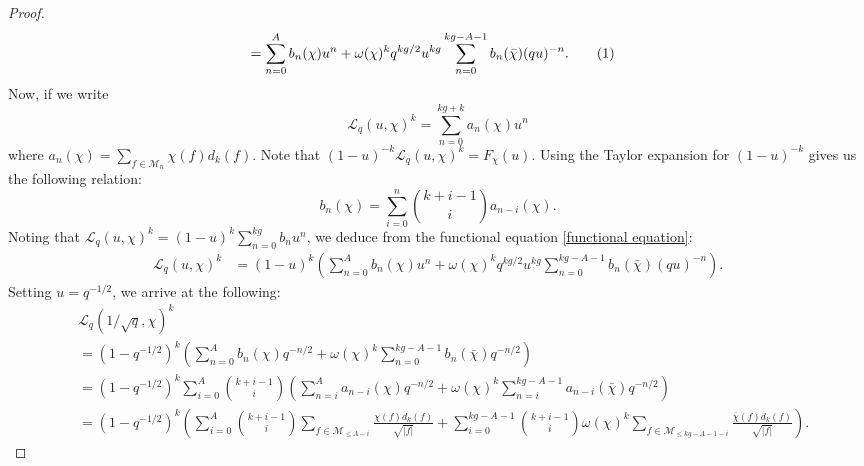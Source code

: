 \documentclass[10pt,a4paper]{amsart}
\newcommand\numberthis{\addtocounter{equation}{1}\tag{\theequation}}
\newcommand{\cM}{\mathcal{M}}
\begin{document}
\begin{proof}
\begin{align*}
    &=\sum_{n=0}^{A} b_n(\chi) u^{n}+\omega(\chi)^k q^{kg/2}u^{kg}\sum_{n=0}^{kg-A-1}b_n(\bar \chi)(qu)^{-n}.\numberthis\label{functional equation}
\end{align*}
Now, if we  write
$$
\mathcal{L}_q\left(u, \chi\right)^{k}=\sum_{n=0}^{k g+k} a_n(\chi) u^{n}
$$
where $a_n(\chi)=\sum_{f \in \mathcal{M}_{n}} \chi(f) d_{k}(f)$.  %
Note that $(1-u)^{-k}\mathcal{L}_q\left(u, \chi\right)^{k}=F_\chi(u)$. Using the Taylor expansion for $(1-u)^{-k}$ gives us the following relation: 
\begin{equation}\label{binomial inversion}
    b_n(\chi)=\sum_{i=0}^{n} \binom{k+i-1}{i} a_{n-i}(\chi).
\end{equation}
 Noting that $\mathcal{L}_q\left(u, \chi\right)^{k}=(1-u)^k\sum_{n=0}^{kg}b_n u^n$, we deduce from the functional equation \eqref{functional equation}:
\begin{align*}
    \mathcal{L}_q\left(u, \chi\right)^{k}&=(1-u)^k\left(\sum_{n=0}^{A} b_n(\chi) u^{n}+\omega(\chi)^k q^{kg/2}u^{kg}\sum_{n=0}^{kg-A-1}b_n(\bar \chi)(qu)^{-n}\right).
\end{align*}
Setting $u=q^{-1/2}$, we arrive at the following:
{\small\begin{align*}&\mathcal{L}_q\left(1/\sqrt{q}, \chi\right)^{k}\\
    & =(1-q^{-1/2})^k\left(\sum_{n=0}^{A} b_n(\chi) q^{-n/2}+\omega(\chi)^k \sum_{n=0}^{kg-A-1}b_n(\bar \chi)q^{-n/2}\right)\\&=(1-q^{-1/2})^k\sum_{i=0}^{A}\binom{k+i-1}{i}\left(\sum_{n=i}^{A} a_{n-i}(\chi) q^{-n/2}+\omega(\chi)^k \sum_{n=i}^{kg-A-1}a_{n-i}(\bar \chi)q^{-n/2}\right)\\&
 =  (1-q^{-1/2})^k \left(\sum_{i=0}^{A}\binom{k+i-1}{i}\sum_{f\in \cM_{\leq A-i}}\frac{\chi(f)d_k(f)}{\sqrt{|f|}}+ \sum_{i=0}^{kg-A-1}\binom{k+i-1}{i}\omega(\chi)^k\sum_{f\in \cM_{\leq kg-A-1-i}}  \frac{\bar{\chi}(f) d_{k}(f)}{\sqrt{|f|}}\right).
\end{align*}}
\end{proof}
\end{document}
